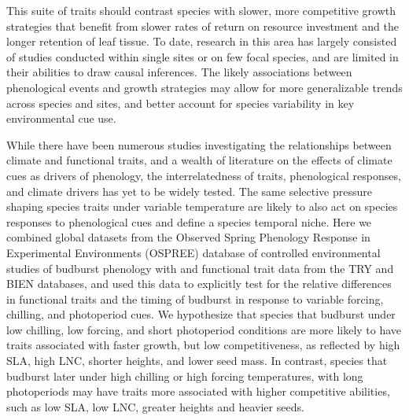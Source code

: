 \documentclass{article}\usepackage[]{graphicx}\usepackage[]{color}
\begin{document}
This suite of traits should contrast species with slower, more competitive growth strategies that benefit from slower rates of return on resource investment and the longer retention of leaf tissue. To date, research in this area has largely consisted of studies conducted within single sites or on few focal species, and are limited in their abilities to draw causal inferences. The likely associations between phenological events and growth strategies may allow for more generalizable trends across species and sites, and better account for species variability in key environmental cue use. 
 
While there have been numerous studies investigating the relationships between climate and functional traits, and a wealth of literature on the effects of climate cues as drivers of phenology, the interrelatedness of traits, phenological responses, and climate drivers has yet to be widely tested. The same selective pressure shaping species traits under variable temperature are likely to also act on species responses to phenological cues and define a species temporal niche. Here we combined global datasets from the Observed Spring Phenology Response in Experimental Environments (OSPREE) database of controlled environmental studies of budburst phenology with and functional trait data from the TRY and BIEN databases, and used this data to explicitly test for the relative differences in functional traits and the timing of budburst in response to variable forcing, chilling, and photoperiod cues. We hypothesize that species that budburst under low chilling, low forcing, and short photoperiod conditions are more likely to have traits associated with faster growth, but low competitiveness, as reflected by high SLA, high LNC, shorter heights, and lower seed mass. In contrast, species that budburst later under high chilling or high forcing temperatures, with long photoperiods  may have traits more associated with higher competitive abilities, such as low SLA, low LNC, greater heights and heavier seeds. 
\end{document}

